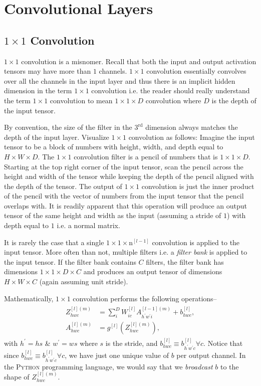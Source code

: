\documentclass[modern]{aastex61}
\newcommand{\un}{\mathrm{n}}
\begin{document}
\section{Convolutional Layers} \label{sec:conv}

\subsection{$1 \times 1$ Convolution} \label{sec:conv11}

$1 \times 1$ convolution is a misnomer. Recall that both the input and output activation tensors may have more than $1$ channels. $1 \times 1$ convolution essentially convolves over all the channels in the input layer and thus there is an implicit hidden dimension in the term $1 \times 1$ convolution i.e. the reader should really understand the term $1 \times 1$ convolution to mean $1 \times 1 \times D$ convolution where $D$ is the depth of the input tensor.

By convention, the size of the filter in the $3^{\mathrm{rd}}$ dimension always matches the depth of the input layer. Visualize $1 \times 1$ convolution as follows: Imagine the input tensor to be a block of numbers with height, width, and depth equal to $H \times W \times D$. The $1 \times 1$ convolution filter is a pencil of numbers that is $1 \times 1 \times D$. Starting at the top right corner of the input tensor, scan the pencil across the height and width of the tensor while keeping the depth of the pencil aligned with the depth of the tensor. The output of $1 \times 1$ convolution is just the inner product of the pencil with the vector of numbers from the input tensor that the pencil overlaps with. It is readily apparent that this operation will produce an output tensor of the same height and width as the input (assuming a stride of $1$) with depth equal to $1$ i.e. a normal matrix.

It is rarely the case that a single $1 \times 1 \times \un^{[l-1]}$ convolution is applied to the input tensor. More often than not, multiple filters i.e. a \textit{filter bank} is applied to the input tensor. If the filter bank contains $C$ filters, the filter bank has dimensions $1 \times 1 \times D \times C$ and produces an output tensor of dimensions $H \times W \times C$ (again assuming unit stride).

Mathematically, $1 \times 1$ convolution performs the following operations--
\begin{align} \label{eq:conv11}
\begin{split}
  Z^{[l](m)}_{hwc} &= \sum_{i}^{D} W^{[l]}_{ic}A^{[l-1](m)}_{h^{'}w^{'}i} + b^{[l]}_{hwc},
\\
  A^{[l](m)}_{hwc} &= g^{[l]}(Z^{[l](m)}_{hwc}),
\end{split}
\end{align}
with $h^{'} = hs$ \& $w^{'} = ws$ where $s$ is the stride, and $b^{[l]}_{hwc} \equiv b^{[l]}_{h^{'}w^{'}c} \forall c$. Notice that since $b^{[l]}_{hwc} \equiv b^{[l]}_{h^{'}w^{'}c} \forall c$, we have just one unique value of $b$ per output channel. In the \textsc{Python} programming language, we would say that we \textit{broadcast} $b$ to the shape of $Z^{[l](m)}_{hwc}$.
\end{document}
